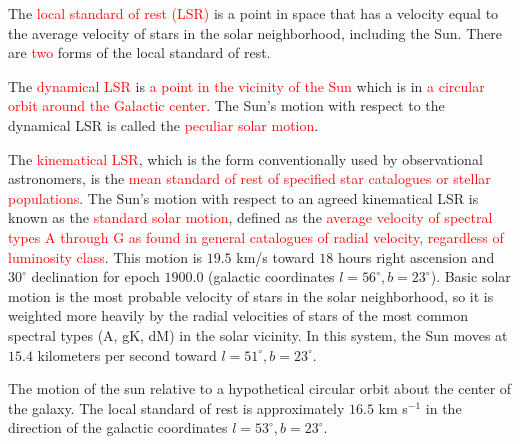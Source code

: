\documentclass[12pt,a4paper]{article}
\begin{document}
The \textcolor{red}{local standard of rest (LSR)} is a point in space that has a velocity equal to the average velocity of stars in the solar neighborhood, including the Sun. There are \textcolor{red}{two} forms of the local standard of rest.

The \textcolor{red}{dynamical LSR} is \textcolor{red}{a point in the vicinity of the Sun} which is in \textcolor{red}{a circular orbit around the Galactic center}. The Sun's motion with respect to the dynamical LSR is called the \textcolor{red}{peculiar solar motion}.

The \textcolor{red}{kinematical LSR}, which is the form conventionally used by observational astronomers, is the \textcolor{red}{mean standard of rest of specified star catalogues or stellar populations}. The Sun's motion with respect to an agreed kinematical LSR is known as the \textcolor{red}{standard solar motion}, defined as the \textcolor{red}{average velocity of spectral types A through G as found in general catalogues of radial velocity, regardless of luminosity class}. This motion is $19.5$ km/s toward $18$ hours right ascension and $30^\circ$ declination for epoch $1900.0$ (galactic coordinates $l=56^\circ, b=23^\circ$). Basic solar motion is the most probable velocity of stars in the solar neighborhood, so it is weighted more heavily by the radial velocities of stars of the most common spectral types (A, gK, dM) in the solar vicinity. In this system, the Sun moves at $15.4$ kilometers per second toward $l=51^\circ, b=23^\circ$.

The motion of the sun relative to a hypothetical circular orbit about the center of the galaxy. The local standard of rest is approximately $16.5$ km s$^{-1}$ in the direction of the galactic coordinates $l = 53^\circ, b = 23^\circ$. 


\end{document}
